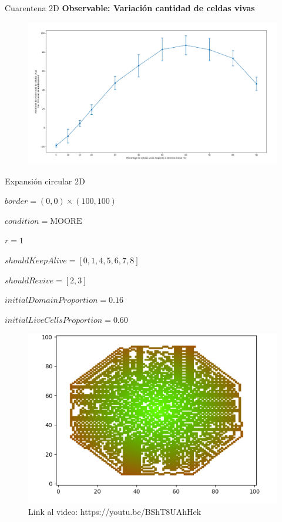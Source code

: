 \begin{frame}{Cuarentena 2D}
    \textbf{Observable: Variación cantidad de celdas vivas}
    \begin{figure}[H]
        \centering
        \includegraphics[width=0.8\linewidth]{pic/cuarentena2d/observable}
        \label{fig:cuarentena:size:slope}
    \end{figure}
\end{frame}




\begin{frame}{Expansión circular 2D}
    \begin{multicols}{2}
        {
            $border = (0, 0) \times (100, 100)$

            $condition = \text{MOORE}$

            $r = 1$

            $shouldKeepAlive = [0, 1, 4, 5, 6, 7, 8]$

            $shouldRevive = [2, 3]$

            $initialDomainProportion = 0.16$

            $initialLiveCellsProportion = 0.60$
        }

        {\begin{figure}[H]
             \centering
             \includegraphics[width=1\linewidth]{pic/circular2d/thumbnail}
             \captionsetup{labelformat=empty}
             \caption{Link al video: https://youtu.be/BShT8UAhHek}
             \label{fig:expcirc2d:thumbnail}
        \end{figure}}
    \end{multicols}
\end{frame}


